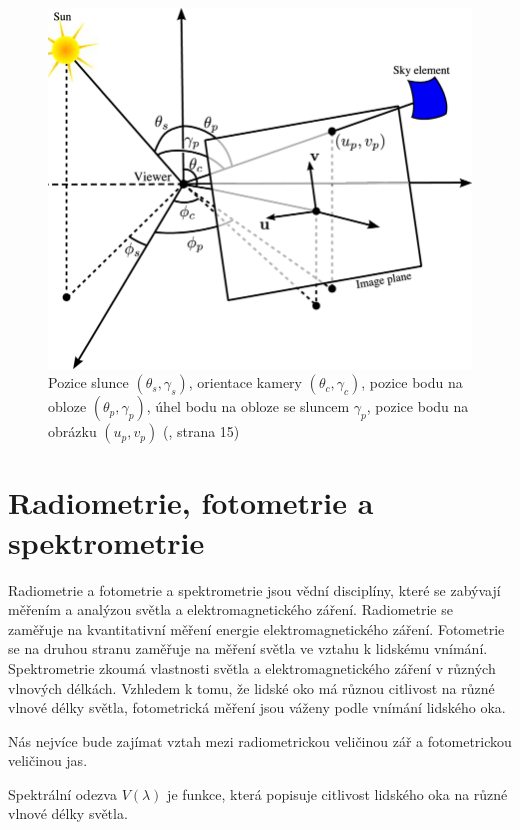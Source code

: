 \begin{figure}[h]\centering
  \includegraphics[width=140mm]{../img/uhly}
  \caption{Pozice slunce $(\theta_s, \gamma_s)$, orientace kamery $(\theta_c, \gamma_c)$, pozice bodu na obloze $(\theta_p, \gamma_p)$, úhel bodu na obloze se sluncem $\gamma_p$, pozice bodu na obrázku $(u_p, v_p)$
  (\citealp{Lalonde10}, strana 15)}
\end{figure}

\section{Radiometrie, fotometrie a spektrometrie}
Radiometrie a fotometrie a spektrometrie jsou vědní disciplíny, které se zabývají měřením a analýzou světla a elektromagnetického záření. 
Radiometrie se zaměřuje na kvantitativní měření energie elektromagnetického záření.
Fotometrie se na druhou stranu zaměřuje na měření světla ve vztahu k lidskému vnímání.
Spektrometrie zkoumá vlastnosti světla a elektromagnetického záření v různých vlnových délkách.
Vzhledem k tomu, že lidské oko má různou citlivost na různé vlnové délky světla, fotometrická měření jsou váženy podle vnímání lidského oka. 

Nás nejvíce bude zajímat vztah mezi radiometrickou veličinou zář a fotometrickou veličinou jas.


\begin{definice}
  Spektrální odezva $V(\lambda)$ je funkce, která popisuje citlivost lidského oka na různé vlnové délky světla.
\end{definice}

